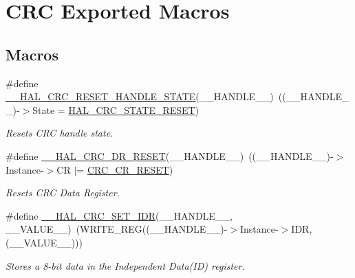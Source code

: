 \hypertarget{group___c_r_c___exported___macros}{}\section{C\+RC Exported Macros}
\label{group___c_r_c___exported___macros}
\subsection*{Macros}
\begin{DoxyCompactItemize}
\item 
\#define \hyperlink{group___c_r_c___exported___macros_gab6ec5d74fdff177143f4b22652a18114}{\+\_\+\+\_\+\+H\+A\+L\+\_\+\+C\+R\+C\+\_\+\+R\+E\+S\+E\+T\+\_\+\+H\+A\+N\+D\+L\+E\+\_\+\+S\+T\+A\+TE}(\+\_\+\+\_\+\+H\+A\+N\+D\+L\+E\+\_\+\+\_\+)~((\+\_\+\+\_\+\+H\+A\+N\+D\+L\+E\+\_\+\+\_\+)-\/$>$State = \hyperlink{group___c_r_c___exported___types___group1_gga1021d6f27a072d45f6f3b233eefd8bbea313bbe8353f8a8b48fbd129261266a97}{H\+A\+L\+\_\+\+C\+R\+C\+\_\+\+S\+T\+A\+T\+E\+\_\+\+R\+E\+S\+ET})
\begin{DoxyCompactList}\small\item\em Resets C\+RC handle state. \end{DoxyCompactList}\item 
\#define \hyperlink{group___c_r_c___exported___macros_ga0007a05fb01806007181e12eedc14d28}{\+\_\+\+\_\+\+H\+A\+L\+\_\+\+C\+R\+C\+\_\+\+D\+R\+\_\+\+R\+E\+S\+ET}(\+\_\+\+\_\+\+H\+A\+N\+D\+L\+E\+\_\+\+\_\+)~((\+\_\+\+\_\+\+H\+A\+N\+D\+L\+E\+\_\+\+\_\+)-\/$>$Instance-\/$>$CR $\vert$= \hyperlink{group___peripheral___registers___bits___definition_ga7d57481fb891a0964b40f721354c56d7}{C\+R\+C\+\_\+\+C\+R\+\_\+\+R\+E\+S\+ET})
\begin{DoxyCompactList}\small\item\em Resets C\+RC Data Register. \end{DoxyCompactList}\item 
\#define \hyperlink{group___c_r_c___exported___macros_ga1d890aa6f337f97fb9a3e8537f1bbc72}{\+\_\+\+\_\+\+H\+A\+L\+\_\+\+C\+R\+C\+\_\+\+S\+E\+T\+\_\+\+I\+DR}(\+\_\+\+\_\+\+H\+A\+N\+D\+L\+E\+\_\+\+\_\+,  \+\_\+\+\_\+\+V\+A\+L\+U\+E\+\_\+\+\_\+)~(W\+R\+I\+T\+E\+\_\+\+R\+EG((\+\_\+\+\_\+\+H\+A\+N\+D\+L\+E\+\_\+\+\_\+)-\/$>$Instance-\/$>$I\+DR, (\+\_\+\+\_\+\+V\+A\+L\+U\+E\+\_\+\+\_\+)))
\begin{DoxyCompactList}\small\item\em Stores a 8-\/bit data in the Independent Data(\+I\+D) register. \end{DoxyCompactList}\item 

\end{DoxyCompactItemize}

